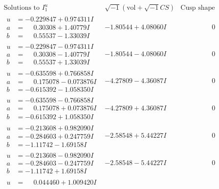 \documentclass[1p]{elsarticle_modified}
\theoremstyle{definition}
\newcommand{\I}{\sqrt{-1}}
\begin{document}
$$\begin{array}{c|c|c}  
\text{Solutions to }I^u_{1}& \I (\text{vol} + \sqrt{-1}CS) & \text{Cusp shape}\\
 \hline 
\begin{aligned}
u &= -0.229847 + 0.974311 I \\
a &= \phantom{-}0.30308 + 1.40779 I \\
b &= \phantom{-}0.55537 - 1.33039 I\end{aligned}
 & -1.80544 + 4.08060 I & \phantom{-0.000000 } 0 \\ \hline\begin{aligned}
u &= -0.229847 - 0.974311 I \\
a &= \phantom{-}0.30308 - 1.40779 I \\
b &= \phantom{-}0.55537 + 1.33039 I\end{aligned}
 & -1.80544 - 4.08060 I & \phantom{-0.000000 } 0 \\ \hline\begin{aligned}
u &= -0.635598 + 0.766858 I \\
a &= \phantom{-}0.175078 - 0.073876 I \\
b &= -0.615392 - 1.058350 I\end{aligned}
 & -4.27809 - 4.36087 I & \phantom{-0.000000 } 0 \\ \hline\begin{aligned}
u &= -0.635598 - 0.766858 I \\
a &= \phantom{-}0.175078 + 0.073876 I \\
b &= -0.615392 + 1.058350 I\end{aligned}
 & -4.27809 + 4.36087 I & \phantom{-0.000000 } 0 \\ \hline\begin{aligned}
u &= -0.213608 + 0.982090 I \\
a &= -0.284603 + 0.247759 I \\
b &= -1.11742 - 1.69158 I\end{aligned}
 & -2.58548 + 5.44227 I & \phantom{-0.000000 } 0 \\ \hline\begin{aligned}
u &= -0.213608 - 0.982090 I \\
a &= -0.284603 - 0.247759 I \\
b &= -1.11742 + 1.69158 I\end{aligned}
 & -2.58548 - 5.44227 I & \phantom{-0.000000 } 0 \\ \hline\begin{aligned}
u &= \phantom{-}0.044460 + 1.009420 I \\

\end{aligned}
\end{array}$$
\end{document}
